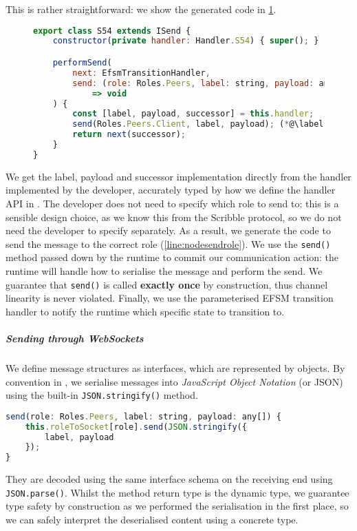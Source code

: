 This is rather straightforward: 
we show the generated code in \cref{lst:nodesend}.

\begin{figure}[!h]
\begin{lstlisting}[language=javascript,tabsize=2]
export class S54 extends ISend {
	constructor(private handler: Handler.S54) { super(); }

	performSend(
		next: EfsmTransitionHandler,
		send: (role: Roles.Peers, label: string, payload: any[]) 
			=> void
	) {
		const [label, payload, successor] = this.handler;
		send(Roles.Peers.Client, label, payload); (*@\label{line:nodesendrole}@*)
		return next(successor);
	}
}
\end{lstlisting}
\label{lst:nodesend}
\end{figure}

We get the label, payload and successor implementation
directly from the handler implemented by the developer, 
accurately typed by how we define the handler API in .
The developer does not need to specify which role
to send to: this is a sensible design choice, as we know this
from the Scribble protocol, so we do not need the developer 
to specify separately.
As a result, we generate the code to send the message
to the correct role (\cref{line:nodesendrole}).
We use the \texttt{send()} method passed down
by the runtime to commit our communication action:
the runtime will handle how to serialise the message and perform
the send. We guarantee that \texttt{send()} is called
\textbf{exactly once} by construction, thus channel linearity
is never violated.
Finally, we use the parameterised EFSM transition handler
to notify the runtime which specific state to transition to.

\subparagraph{Sending through WebSockets}
We define message structures as interfaces, which
are represented by objects. 
By convention in ,
we serialise messages into \textit{JavaScript Object Notation}
(or JSON) \cite{json} using the built-in \texttt{JSON.stringify()}
method.

\begin{lstlisting}[language=javascript]
send(role: Roles.Peers, label: string, payload: any[]) {
	this.roleToSocket[role].send(JSON.stringify({
		label, payload
	});
}
\end{lstlisting}

They are decoded using the same interface schema on the receiving end
using \texttt{JSON.parse()}.
Whilst the method return type is the
dynamic  type, 
we guarantee type safety by construction
as we performed the serialisation in the first place, so
we can safely interpret the deserialised content 
using a concrete type.

